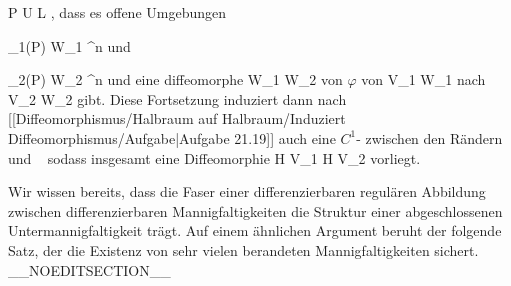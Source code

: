 {\mavergleichskette
{\vergleichskette
{ P
}
{ \in }{ U \cap L
}
{  }{
}
{    }{
}
{   }{
}
}
{}{}{,}
dass es offene Umgebungen

\mavergleichskette
{\vergleichskette
{ \alpha_1(P)
}
{ \in }{ W_1
}
{ \subseteq }{ \R^n
}
{    }{
}
{   }{
}
}
{}{}{}
und

\mavergleichskette
{\vergleichskette
{ \alpha_2(P)
}
{ \in }{ W_2
}
{ \subseteq }{ \R^n
}
{    }{
}
{   }{
}
}
{}{}{}
und eine diffeomorphe
\maabbdisp {\tilde{\varphi}} { W_1 } { W_2
} {}
von $\varphi$ von
\mathkor {} {V_1 \cap W_1} {nach} {V_2 \cap W_2} {}
gibt. Diese Fortsetzung induziert dann
nach [[Diffeomorphismus/Halbraum auf Halbraum/Induziert Diffeomorphismus/Aufgabe|Aufgabe 21.19]]
auch eine
$C^1$-
zwischen den Rändern
 und
  sodass insgesamt eine Diffeomorphie
 { \partial H \cap V_1 } { \partial H \cap V_2
} {}
vorliegt.

}

Wir wissen bereits, dass die Faser einer differenzierbaren regulären Abbildung zwischen differenzierbaren Mannigfaltigkeiten die Struktur einer abgeschlossenen Untermannigfaltigkeit trägt. Auf einem ähnlichen Argument beruht der folgende Satz, der die Existenz von sehr vielen berandeten Mannigfaltigkeiten sichert.
__NOEDITSECTION__

